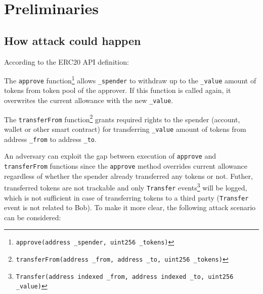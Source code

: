 
\section{Preliminaries}

\subsection{How attack could happen}

According to the ERC20 API definition:

\begin{compactlist}
\item The \texttt{approve} function\footnote{\texttt{approve(address \texttt{\_spender}, uint256 \texttt{\_tokens})}} allows \texttt{\_spender} to withdraw up to the \texttt{\_value} amount of tokens from token pool of the approver. If this function is called again, it overwrites the current allowance with the new \texttt{\_value}.
\item The \texttt{transferFrom} function\footnote{\texttt{transferFrom(address \texttt{\_from}, address \texttt{\_to}, uint256 \texttt{\_tokens})}}  grants required rights to the spender (account, wallet or other smart contract) for transferring \texttt{\_value} amount of tokens from address \texttt{\_from} to address \texttt{\_to}.
\end{compactlist}

An adversary can exploit the gap between execution of \texttt{approve} and \texttt{transferFrom} functions since the \texttt{approve} method overrides current allowance regardless of whether the spender already transferred any tokens or not. Futher, transferred tokens are not trackable and only \texttt{Transfer} events\footnote{\texttt{Transfer(address indexed \texttt{\_from}, address indexed \texttt{\_to}, uint256 \texttt{\_value})}} will be logged, which is not sufficient in case of transferring tokens to a third party (\texttt{Transfer} event is not related to Bob). To make it more clear, the following attack scenario can be considered:


